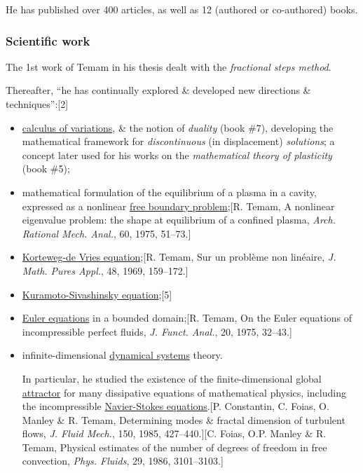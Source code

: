 \documentclass{article}
\begin{document}
He has published over 400 articles, as well as 12 (authored or co-authored) books.

\subsubsection{Scientific work}
The 1st work of Temam in his thesis dealt with the \textit{fractional steps method}.

Thereafter, ``he has continually explored \& developed new directions \& techniques'':[2]
\begin{itemize}
	\item \href{https://en.wikipedia.org/wiki/Calculus_of_variations}{calculus of variations}, \& the notion of \textit{duality} (book \#7), developing the mathematical framework for \textit{discontinuous} (in displacement) \textit{solutions}; a concept later used for his works on the \textit{mathematical theory of plasticity} (book \#5);
	\item mathematical formulation of the equilibrium of a plasma in a cavity, expressed as a nonlinear \href{https://en.wikipedia.org/wiki/Free_boundary_problem}{free boundary problem};[R. Temam, A nonlinear eigenvalue problem: the shape at equilibrium of a confined plasma, \textit{Arch. Rational Mech. Anal.}, 60, 1975, 51--73.]
	\item \href{https://en.wikipedia.org/wiki/Korteweg-de_Vries_equation}{Korteweg-de Vries equation};[R. Temam, Sur un problème non linéaire, \textit{J. Math. Pures Appl.}, 48, 1969, 159--172.]
	\item \href{https://en.wikipedia.org/wiki/Kuramoto%E2%80%93Sivashinsky_equation}{Kuramoto-Sivashinsky equation};[5]
	\item \href{https://en.wikipedia.org/wiki/Euler_equations}{Euler equations} in a bounded domain;[R. Temam, On the Euler equations of incompressible perfect fluids, \textit{J. Funct. Anal.}, 20, 1975, 32--43.]
	\item infinite-dimensional \href{https://en.wikipedia.org/wiki/Dynamical_systems}{dynamical systems} theory.
	
	In particular, he studied the existence of the finite-dimensional global \href{https://en.wikipedia.org/wiki/Attractor}{attractor} for many dissipative equations of mathematical physics, including the incompressible \href{https://en.wikipedia.org/wiki/Navier-Stokes_equations}{Navier-Stokes equations}.[P. Constantin, C. Foias, O. Manley \& R. Temam, Determining modes \& fractal dimension of turbulent flows, \textit{J. Fluid Mech.}, 150, 1985, 427--440.][C. Foias, O.P. Manley \& R. Temam, Physical estimates of the number of degrees of freedom in free convection, \textit{Phys. Fluids}, 29, 1986, 3101--3103.]
	

\end{itemize}
\end{document}
